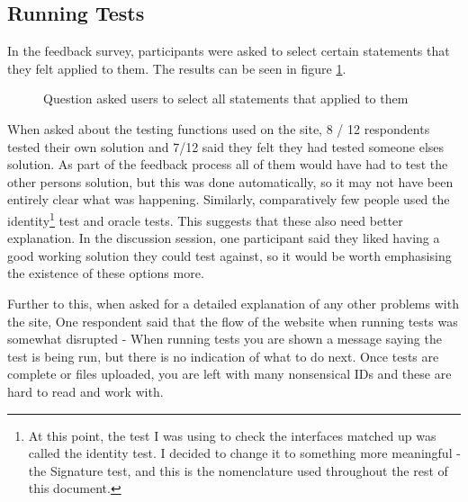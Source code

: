 \documentclass[a4paper,11pt]{report}
\begin{document}
\subsection{Running Tests}
In the feedback survey, participants were asked to select certain statements that they felt applied to them. The results can be seen in figure \ref{fig:stmt-test}.\par
\begin{figure}[ht]
\centering
\small
{}
\caption{Question asked users to select all statements that applied to them}
\label{fig:stmt-test}
\end{figure}
When asked about the testing functions used on the site, 8 / 12 respondents tested their own solution and 7/12 said they felt they had tested someone elses solution. As part of the feedback process all of them would have had to test the other persons solution, but this was done automatically, so it may not have been entirely clear what was happening. Similarly, comparatively few people used the identity\footnote{At this point, the test I was using to check the interfaces matched up was called the identity test. I decided to change it to something more meaningful - the Signature test, and this is the nomenclature used throughout the rest of this document.} test and oracle tests. This suggests that these also need better explanation. In the discussion session, one participant said they liked having a good working solution they could test against, so it would be worth emphasising the existence of these options more.\par
Further to this, when asked for a detailed explanation of any other problems with the site, One respondent said that the flow of the website when running tests was somewhat disrupted - When running tests you are shown a message saying the test is being run, but there is no indication of what to do next. Once tests are complete or files uploaded, you are left with many nonsensical IDs and these are hard to read and work with.
\end{document}

